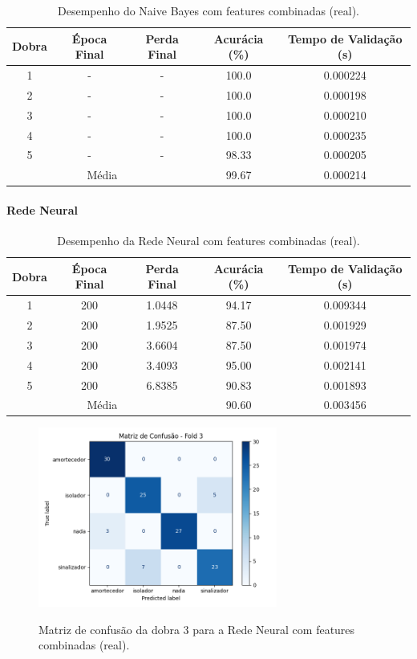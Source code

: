 \begin{table}[H]
\caption{Desempenho do Naive Bayes com features combinadas (real).}
\centering
\begin{tabular}{ccccc}
\hline
\textbf{Dobra} & \textbf{Época Final} & \textbf{Perda Final} & \textbf{Acurácia (\%)} & \textbf{Tempo de Validação (s)}  \\
\hline
1 & - & - & 100.0 & 0.000224 \\
2 & - & - & 100.0 & 0.000198 \\
3 & - & - & 100.0 & 0.000210 \\
4 & - & - & 100.0 & 0.000235 \\
5 & - & - & 98.33 & 0.000205 \\
\hline
\multicolumn{3}{c}{Média} & 99.67 & 0.000214 \\
\hline
\end{tabular}
\fonte{}
\label{tab:resultados_naive_lidar_real}
\end{table}

\paragraph{Rede Neural}

\begin{table}[H]
\caption{Desempenho da Rede Neural com features combinadas (real).}
\centering
\begin{tabular}{ccccc}
\hline
\textbf{Dobra} & \textbf{Época Final} & \textbf{Perda Final} & \textbf{Acurácia (\%)} & \textbf{Tempo de Validação (s)}  \\
\hline
1 & 200 & 1.0448 & 94.17 & 0.009344 \\
2 & 200 & 1.9525 & 87.50 & 0.001929 \\
3 & 200 & 3.6604 & 87.50 & 0.001974 \\
4 & 200 & 3.4093 & 95.00 & 0.002141 \\
5 & 200 & 6.8385 & 90.83 & 0.001893 \\
\hline
\multicolumn{3}{c}{Média} & 90.60 & 0.003456 \\
\hline
\end{tabular}
\fonte{}
\label{tab:resultados_nn_lidar_real}
\end{table}

\begin{figure}[H]
\centering
\caption{Matriz de confusão da dobra 3 para a Rede Neural com features combinadas (real).}
\includegraphics[width=0.7\textwidth]{figuras/Resultados/real_principal_Teste5_nn.png}
\label{fig:matriz_confusao_nn_dobra3}
\fonte{}
\end{figure}


